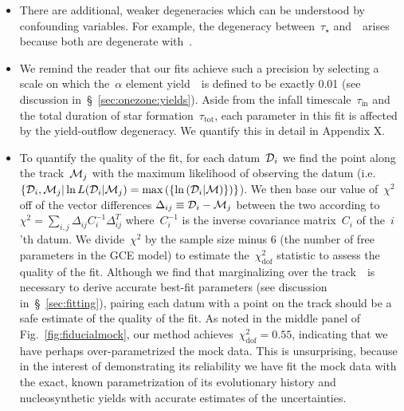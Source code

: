 \documentclass[ms.tex]{subfiles}
\begin{document}
\begin{itemize}


	\item There are additional, weaker degeneracies which can be understood
	by confounding variables.
	For example, the degeneracy between~$\tau_\star$ and~\yfeia~arises because
	both are degenerate with~\yfecc.

	\item We remind the reader that our fits achieve such a precision by
	selecting a scale on which the~$\alpha$ element yield~\yacc~is defined to
	be exactly 0.01 (see discussion in~\S~\ref{sec:onezone:yields}).
	Aside from the infall timescale~$\tau_\text{in}$ and the total duration of
	star formation~$\tau_\text{tot}$, each parameter in this fit is affected by
	the yield-outflow degeneracy.
	We quantify this in detail in Appendix X.

	\item To quantify the quality of the fit, for each datum~$\mathcal{D}_i$
	we find the point along the track~$\mathcal{M}_j$ with the maximum
	likelihood of observing the datum (i.e.~$\{\mathcal{D}_i, \mathcal{M}_j |
	\ln L(\mathcal{D}_i | \mathcal{M}_j) = \max\left(\{
	\ln \left(\mathcal{D}_i | \mathcal{M}\right)\}\right)\}$).
	We then base our value of~$\chi^2$ off of the vector differences
	$\Delta_{ij} \equiv \mathcal{D}_i - \mathcal{M}_j$ between the two according
	to $\chi^2 = \sum_{i,j} \Delta_{ij}C_i^{-1}\Delta_{ij}^T$ where~$C_i^{-1}$
	is the inverse covariance matrix~$C_i$ of the~$i$'th datum.
	We divide~$\chi^2$ by the sample size minus 6 (the number of free
	parameters in the GCE model) to estimate the~$\chi^2_\text{dof}$ statistic
	to assess the quality of the fit.
	Although we find that marginalizing over the track~~is necessary
	to derive accurate best-fit parameters (see discussion
	in~\S~\ref{sec:fitting}), pairing each datum with a point on the track
	should be a safe estimate of the quality of the fit.
	As noted in the middle panel of Fig.~\ref{fig:fiducialmock}, our method
	achieves~$\chi_\text{dof}^2 = 0.55$, indicating that we have perhaps
	over-parametrized the mock data.
	This is unsurprising, because in the interest of demonstrating its
	reliability we have fit the mock data with the exact, known parametrization
	of its evolutionary history and nucleosynthetic yields with accurate
	estimates of the uncertainties.

\end{itemize}
\end{document}
